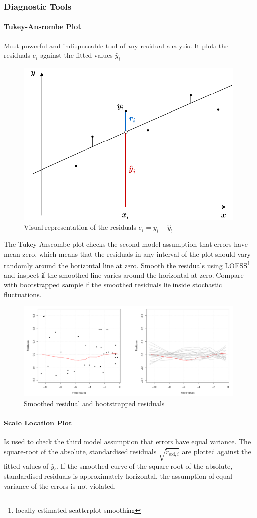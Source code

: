 \documentclass[11pt]{article}
\theoremstyle{definition}
\begin{document}
\subsubsection{Diagnostic Tools}
\label{sssec:DiagnosticPlots}
\paragraph{Tukey-Anscombe Plot}
Most powerful and indispensable tool of any residual analysis. It plots the residuals $e_i$ against the fitted values $\hat{y}_i$
\begin{figure}[H]
	\centering
	\includegraphics[width=0.5\linewidth]{img/TukeyAnscombe.pdf}
	\caption{Visual representation of the residuals $e_i = y_i - \hat{y}_i$}
\end{figure}
The Tukey-Anscombe plot checks the second model assumption that errors have mean zero, which means that the residuals in any interval of the plot should vary randomly around the horizontal line at zero.
Smooth the residuals using LOESS\footnote{locally estimated scatterplot smoothing} and inspect if the smoothed line varies around the horizontal at zero. Compare with bootstrapped sample if the smoothed residuals lie inside stochastic fluctuations.

\begin{figure}[H]
	\centering
	\includegraphics[width=0.8\linewidth]{img/tukey_anscombe_plot}
	\caption{Smoothed residual and bootstrapped residuals}
	\label{fig:tukeyanscombeplot}
\end{figure}


\paragraph{Scale-Location Plot}
Is used to check the third model assumption that errors have equal variance. The square-root of the absolute, standardised residuals $\sqrt{\tilde{r}_{\text{std},i}}$ are plotted against the fitted values of $\hat{y}_i$. If the smoothed curve of the square-root of the absolute, standardised residuals is approximately horizontal, the assumption of equal variance of the errors is not violated.
\end{document}

